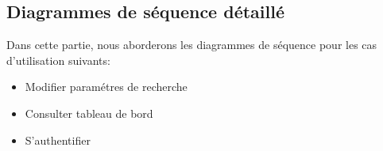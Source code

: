 \subsection{Diagrammes de séquence détaillé}
\noindent
Dans cette partie, nous aborderons les diagrammes de séquence pour les cas
d'utilisation suivants:
\begin{itemize}
	\item Modifier paramétres de recherche
	\item Consulter tableau de bord
	\item S'authentifier
\end{itemize}


